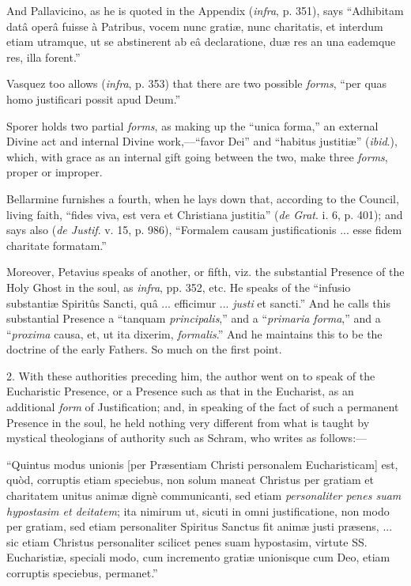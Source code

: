 And Pallavicino, as he is quoted in the Appendix (\emph{infra}, p.
351), says ``Adhibitam datâ operâ fuisse à Patribus, vocem nunc
gratiæ, nunc charitatis, et interdum etiam utramque, ut se
abstinerent ab eâ declaratione, duæ res an una eademque res, illa
forent.''


Vasquez too allows (\emph{infra}, p. 353) that there are two
possible \emph{forms}, ``per quas homo justificari possit apud
Deum.''


Sporer holds two partial \emph{forms}, as making up the ``unica
forma,'' an external Divine act and internal Divine work,—``favor
Dei'' and ``habitus justitiæ'' (\emph{ibid}.), which,
with grace as an internal gift going between the two, make three \emph{forms},
proper or improper.


Bellarmine furnishes a fourth, when he lays down that, according to
the Council, living faith, ``fides viva, est vera et Christiana
justitia'' (\emph{de Grat}. i. 6, p. 401); and says also (\emph{de
Justif}. v. 15, p. 986), ``Formalem causam justificationis ...
esse fidem charitate formatam.''


Moreover, Petavius speaks of another, or fifth, viz. the
substantial Presence of the Holy Ghost in the soul, as \emph{infra},
pp. 352, etc. He speaks of the ``infusio substantiæ Spiritûs
Sancti, quâ ... efficimur ... \emph{justi} et sancti.'' And he
calls this substantial Presence a ``tanquam \emph{principalis},''
and a ``\emph{primaria forma},'' and a ``\emph{proxima}
causa, et, ut ita dixerim, \emph{formalis}.'' And he maintains
this to be the doctrine of the early Fathers. So much on the first
point.


2. With these authorities preceding him, the author went on to
speak of the Eucharistic Presence, or a Presence such as that in the
Eucharist, as an additional \emph{form} of Justification; and, in
speaking of the fact of such a permanent Presence in the soul, he held
nothing very different from what is taught by mystical theologians of
authority such as Schram, who writes as follows:—


``Quintus modus unionis [per Præsentiam Christi personalem
Eucharisticam] est, quòd, corruptis etiam speciebus, non solum maneat
Christus per gratiam et charitatem unitus animæ dignè communicanti,
sed etiam \emph{personaliter penes suam hypostasim et deitatem}; ita
nimirum ut, sicuti in omni justificatione, non modo per gratiam, sed
etiam personaliter Spiritus Sanctus fit animæ justi præsens, ... sic
etiam Christus personaliter scilicet penes suam hypostasim, virtute
SS. Eucharistiæ, speciali modo, cum incremento gratiæ unionisque cum
Deo, etiam corruptis speciebus, permanet.''


